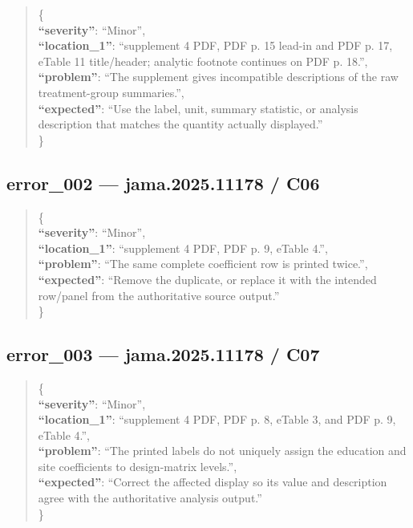 \documentclass[
  letterpaper,
  9pt]{extreport}
\begin{document}
\begin{quote}
\{\\
\textbf{``severity''}: ``Minor'',\\
\textbf{``location\_1''}: ``supplement 4 PDF, PDF p. 15 lead-in and PDF
p. 17, eTable 11 title/header; analytic footnote continues on PDF p.
18.'',\\
\textbf{``problem''}: ``The supplement gives incompatible descriptions
of the raw treatment-group summaries.'',\\
\textbf{``expected''}: ``Use the label, unit, summary statistic, or
analysis description that matches the quantity actually displayed.''\\
\}
\end{quote}

\hypertarget{error_002--jama202511178--c06}{%
\subsection{error\_002 --- jama.2025.11178 /
C06}\label{error_002--jama202511178--c06}}

\begin{quote}
\{\\
\textbf{``severity''}: ``Minor'',\\
\textbf{``location\_1''}: ``supplement 4 PDF, PDF p. 9, eTable 4.'',\\
\textbf{``problem''}: ``The same complete coefficient row is printed
twice.'',\\
\textbf{``expected''}: ``Remove the duplicate, or replace it with the
intended row/panel from the authoritative source output.''\\
\}
\end{quote}

\hypertarget{error_003--jama202511178--c07}{%
\subsection{error\_003 --- jama.2025.11178 /
C07}\label{error_003--jama202511178--c07}}

\begin{quote}
\{\\
\textbf{``severity''}: ``Minor'',\\
\textbf{``location\_1''}: ``supplement 4 PDF, PDF p. 8, eTable 3, and
PDF p. 9, eTable 4.'',\\
\textbf{``problem''}: ``The printed labels do not uniquely assign the
education and site coefficients to design-matrix levels.'',\\
\textbf{``expected''}: ``Correct the affected display so its value and
description agree with the authoritative analysis output.''\\
\}
\end{quote}
\end{document}
